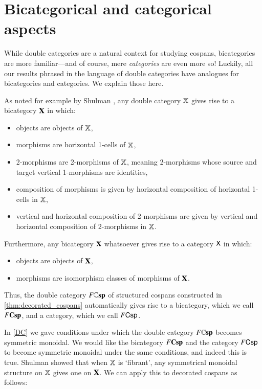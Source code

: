 \documentclass[reqno]{amsart}
\begin{document}
\section{Bicategorical and categorical aspects}
\label{spinoffs}

While double categories are a natural context for studying cospans, bicategories are more 
familiar---and of course, mere \emph{categories} are even more so!   Luckily, all our results 
phrased in the language of double categories have analogues for bicategories and categories.  
We explain those here.

As noted for example by Shulman \cite{Shulman2010}, any double category $\mathbf{\mathbb X}$ gives rise to a bicategory $\mathbf{X}$ in which:
\begin{itemize}
\item objects are objects of $\mathbf{\mathbb X}$,
\item morphisms are horizontal 1-cells of $\mathbf{\mathbb X}$,
\item 2-morphisms are  2-morphisms of $\mathbf{\mathbb X}$, meaning 2-morphisms whose source and target vertical 1-morphisms are identities,
\item composition of morphisms is given by horizontal composition of horizontal 1-cells in $\mathbf{\mathbb X}$,
\item vertical and horizontal composition of 2-morphisms are given by vertical and horizontal
composition of 2-morphisms in $\mathbf{\mathbb X}$.
\end{itemize}
Furthermore, any bicategory $\mathbf{X}$ whatsoever gives rise to a category $\mathsf{X}$ in which:
\begin{itemize}
\item objects are objects of $\mathbf{X}$,
\item morphisms are isomorphism classes of morphisms of $\mathbf{X}$.   
\end{itemize}
Thus, the double category $F\mathbf{\mathbb Csp}$ of structured cospans constructed in \cref{thm:decorated_cospans} automatically gives rise to a bicategory, which we call $F\mathbf{Csp}$, and a category, which we call $F\mathsf{Csp}$.

In \cref{DC} we gave conditions under which the double category $F\mathbf{\mathbb Csp}$ becomes symmetric
monoidal.   We would like the bicategory $F\mathbf{Csp}$ and the category $F\mathsf{Csp}$ to become symmetric
monoidal under the same conditions, and indeed this is true.  Shulman \cite[Thm.\ 1.2]{Shulman2010} showed that when $\mathbf{\mathbb X}$ is `fibrant', any symmetrical monoidal structure on $\mathbf{\mathbb X}$ gives one on $\mathbf{X}$.     We can apply this to decorated cospans as follows:
\end{document}
